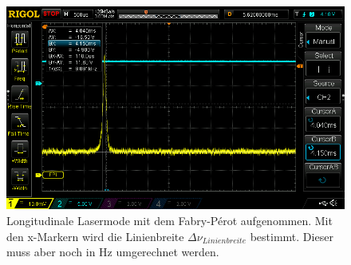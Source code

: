 \begin{figure}[ht]
    \centering
    \includegraphics[width = \linewidth]{Bilder/Auswertung/FabryPerotLinienbreiteSingle.png}
    \caption{Longitudinale Lasermode mit dem Fabry-Pérot aufgenommen. Mit den x-Markern wird die Linienbreite $\Delta \nu_{Linienbreite}$ bestimmt. Dieser muss aber noch in Hz umgerechnet werden.}
    \label{bild:LininebreiteSingle}
\end{figure}

